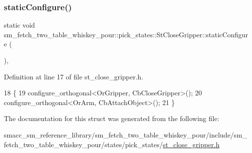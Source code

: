 \subsubsection{\texorpdfstring{static\+Configure()}{staticConfigure()}}
{\footnotesize\ttfamily static void sm\+\_\+fetch\+\_\+two\+\_\+table\+\_\+whiskey\+\_\+pour\+::pick\+\_\+states\+::\+St\+Close\+Gripper\+::static\+Configure (\begin{DoxyParamCaption}{ }\end{DoxyParamCaption})\hspace{0.3cm}{\ttfamily [inline]}, {\ttfamily [static]}}



Definition at line 17 of file st\+\_\+close\+\_\+gripper.\+h.


\begin{DoxyCode}
18          \{
19             configure\_orthogonal<OrGripper, CbCloseGripper>();
20             configure\_orthogonal<OrArm, CbAttachObject>();
21          \}
\end{DoxyCode}


The documentation for this struct was generated from the following file\+:\begin{DoxyCompactItemize}
\item 
smacc\+\_\+sm\+\_\+reference\+\_\+library/sm\+\_\+fetch\+\_\+two\+\_\+table\+\_\+whiskey\+\_\+pour/include/sm\+\_\+fetch\+\_\+two\+\_\+table\+\_\+whiskey\+\_\+pour/states/pick\+\_\+states/\hyperlink{sm__fetch__two__table__whiskey__pour_2include_2sm__fetch__two__table__whiskey__pour_2states_2pic9b52ae011b32deb84a79207e49acd0c2}{st\+\_\+close\+\_\+gripper.\+h}\end{DoxyCompactItemize}
